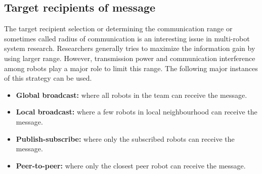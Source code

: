 \documentclass{intech}
\begin{document}
\subsection*{Target recipients of message}
The target recipient selection or determining the communication range or sometimes called radius of communication is an interesting issue in multi-robot system research. Researchers generally tries to maximize the information gain by using larger range. However, transmission power and communication interference among robots play a major role to limit this range. The following major instances of this strategy can be used.
\begin{itemize}
\item \textbf{Global broadcast:} where all robots in the team can receive the message.
\item \textbf{Local broadcast:} where a few robots in local neighbourhood can receive the message.
\item \textbf{Publish-subscribe:} where only the  subscribed robots can receive the message.
\item \textbf{Peer-to-peer:} where only the closest peer robot can receive the message.
\end{itemize}
\end{document}

